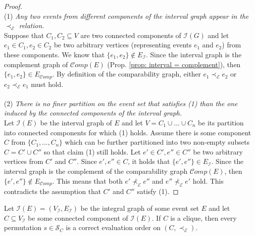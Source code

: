 \begin{proof}
\leavevmode \\ 
(1) \textit{Any two events from different components of the interval graph appear in the $\prec_{\mathcal{E}}$ relation.}\\
Suppose that $C_1, C_2 \subseteq V$ are two connected components of $\mathcal{I}(G)$ and let $e_1 \in C_1, e_2 \in C_2$ be two arbitrary vertices (representing events $e_1$ and $e_2$) from these components.
We know that $\{e_1,e_2\} \not \in E_{\mathcal{I}}$.
Since the interval graph is the complement graph of $\mathcal{C}omp(E)$ (Prop. \ref{prop: interval = complement}), then $\{e_1,e_2\} \in E_{\mathcal{C}omp}$.
By definition of the comparability graph, either $e_1 \prec_{\mathcal{E}} e_2$ or $e_2 \prec_{\mathcal{E}} e_1$ must hold.\\ \\
(2) \textit{There is no finer partition on the event set that satisfies (1) than the one induced by the connected components of the interval graph.}\\
Let $\mathcal{I}(E)$ be the interval graph of $E$  and let $V= C_1 \cup ... \cup C_n$ be its partition into connected components for which (1) holds.
Assume there is some component $C$ from $\{C_1,...,C_n\}$ which can be further partitioned into two non-empty subsets $C=C' \cup C''$ so that claim (1) still holds.
Let $e' \in C', e'' \in C''$ be two arbitrary vertices from $C'$ and $C''$.
Since $e',e'' \in C$, it holds that $\{e',e''\} \in E_{\mathcal{I}}$. 
Since the interval graph is the complement of the comparability graph $\mathcal{C}omp(E)$, then $\{e',e''\} \not \in E_{\mathcal{C}omp}$.
This means that both $e' \not \prec_{\mathcal{E}} e''$ and $e'' \not \prec_{\mathcal{E}} e'$ hold.
This contradicts the assumption that $C'$ and $C''$ satisfy (1).
\end{proof}

\begin{proposition}\label{prop: clique}
Let $\mathcal{I}(E)=(V_{\mathcal{I}},E_{\mathcal{I}})$ be the integral graph of some event set $E$ and let $C \subseteq V_{\mathcal{I}}$ be some connected component of $\mathcal{I}(E)$.
If $C$ is a clique, then every permutation $s \in \mathcal{S}_C$ is a correct evaluation order on $(C,\prec_{\mathcal{E}})$.
\end{proposition}


